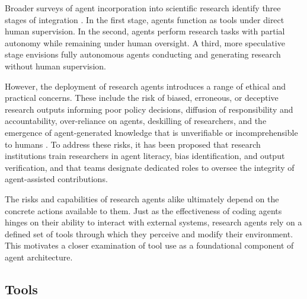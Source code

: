 \documentclass[
english,                 %
bibtex,                  %
includeExtraAbstracts, %
]{kththesis}
\numberwithin{listing}{chapter}
\begin{document}
Broader surveys of agent incorporation into scientific research identify three stages of integration \cite{resnik_autonomous_2026}. In the first stage, agents function as tools under direct human supervision. In the second, agents perform research tasks with partial autonomy while remaining under human oversight. A third, more speculative stage envisions fully autonomous agents conducting and generating research without human supervision.

However, the deployment of research agents introduces a range of ethical and practical concerns. These include the risk of biased, erroneous, or deceptive research outputs informing poor policy decisions, diffusion of responsibility and accountability, over-reliance on agents, deskilling of researchers, and the emergence of agent-generated knowledge that is unverifiable or incomprehensible to humans \cite{hosseini_benefits_2026}. To address these risks, it has been proposed that research institutions train researchers in agent literacy, bias identification, and output verification, and that teams designate dedicated roles to oversee the integrity of agent-assisted contributions.

The risks and capabilities of research agents alike ultimately depend on the concrete actions available to them. Just as the effectiveness of coding agents hinges on their ability to interact with external systems, research agents rely on a defined set of tools through which they perceive and modify their environment. This motivates a closer examination of tool use as a foundational component of agent architecture.

\subsection{Tools}
\end{document}
